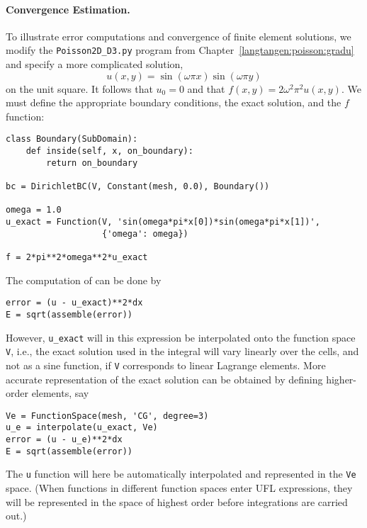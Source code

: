 \paragraph{Convergence Estimation.}
To illustrate error computations and convergence of finite element
solutions, we modify the {\fontsize{12pt}{12pt}\verb!Poisson2D_D3.py!} program from
Chapter~\ref{langtangen:poisson:gradu} and specify a more complicated solution,
\[ u(x,y) = \sin(\omega\pi x)\sin(\omega\pi y)\]
on the unit square. It follows that $u_0=0$ and that $f(x,y)=2\omega^2\pi^2
u(x,y)$. We must define the
appropriate boundary conditions, the exact solution, and the $f$ function:
\begin{Verbatim}[fontsize=\fontsize{10pt}{10pt},tabsize=8,baselinestretch=1.05,
fontfamily=tt,xleftmargin=7mm]
class Boundary(SubDomain):
    def inside(self, x, on_boundary):
        return on_boundary

bc = DirichletBC(V, Constant(mesh, 0.0), Boundary())

omega = 1.0
u_exact = Function(V, 'sin(omega*pi*x[0])*sin(omega*pi*x[1])',
                   {'omega': omega})

f = 2*pi**2*omega**2*u_exact
\end{Verbatim}
\noindent

The computation of  can be done by
\begin{Verbatim}[fontsize=\fontsize{10pt}{10pt},tabsize=8,baselinestretch=1.05,
fontfamily=tt,xleftmargin=7mm]
error = (u - u_exact)**2*dx
E = sqrt(assemble(error))
\end{Verbatim}
\noindent
However, {\fontsize{12pt}{12pt}\verb!u_exact!} will in this expression be interpolated onto
the function space {\fontsize{12pt}{12pt}\texttt{V}}, i.e., the exact solution used in
the integral will vary linearly over
the cells, and not as a sine function, 
if {\fontsize{12pt}{12pt}\texttt{V}} corresponds to linear Lagrange elements.
More accurate representation of the exact solution can be obtained
by defining higher-order elements, say
\begin{Verbatim}[fontsize=\fontsize{10pt}{10pt},tabsize=8,baselinestretch=1.05,
fontfamily=tt,xleftmargin=7mm]
Ve = FunctionSpace(mesh, 'CG', degree=3)
u_e = interpolate(u_exact, Ve)
error = (u - u_e)**2*dx
E = sqrt(assemble(error))
\end{Verbatim}
\noindent
{}
The {\fontsize{12pt}{12pt}\texttt{u}} function will here be automatically interpolated and
represented in the
{\fontsize{12pt}{12pt}\texttt{Ve}} space. (When functions in different function spaces enter
UFL expressions, they will be represented in the space of highest
order before integrations are carried out.)


